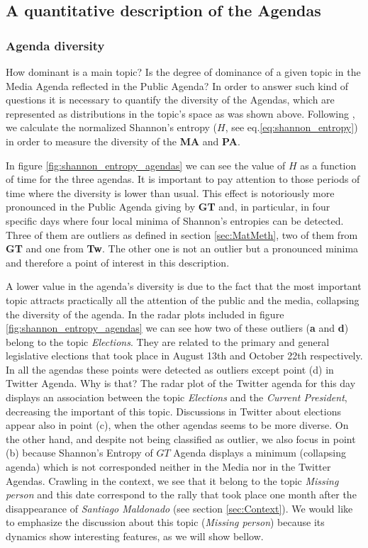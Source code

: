 \documentclass{bmcart}
\begin{document}
\subsection*{A quantitative description of the Agendas}

\subsubsection*{Agenda diversity}

\par How dominant is a main topic? Is the degree of dominance of a given topic in the Media Agenda reflected in the Public Agenda? In order to answer such kind of questions it is necessary  to quantify the diversity of the Agendas, which are represented as  distributions in the topic's space as was shown above.
Following \cite{boydstun2014importance}, we calculate the normalized Shannon's entropy ($H$, see eq.\ref{eq:shannon_entropy}) in order to measure the diversity of the \textbf{MA} and \textbf{PA}.
\par In figure \ref{fig:shannon_entropy_agendas} we can see the value of $H$ as a function of time for the three agendas. It is important to pay attention to those periods of time where the diversity is lower than usual. This effect is notoriously more pronounced in the Public Agenda giving by \textbf{GT} and, in particular, in four specific days  where  four local minima of Shannon's entropies can be detected. Three of them are outliers as defined in section \ref{sec:MatMeth}, two of them from \textbf{GT} and one from \textbf{Tw}. The other one is not an outlier but a pronounced minima and therefore a point of interest in this description. 
 
\par A lower value in the agenda's diversity is due to the fact that the most important topic attracts practically all the attention of the public and the media, collapsing the diversity of the agenda.
In the radar plots included in figure \ref{fig:shannon_entropy_agendas} we can see how two of these outliers (\textbf{a} and \textbf{d}) belong to the topic \emph{Elections}. They are related to the primary and general legislative elections that took place in August 13th and October 22th respectively.
In all the agendas these points were detected as outliers except point (d) in Twitter Agenda. Why is that? The radar plot of the Twitter agenda for this day displays an association between the topic \emph{Elections} and the \emph{Current President}, decreasing the important of this topic.
Discussions in Twitter about elections appear also in point (c), when the other agendas seems to be more diverse. 
On the other hand, and despite not being classified as outlier, we also focus in point (b) because Shannon's Entropy of $GT$ Agenda displays a minimum (collapsing agenda) which is not corresponded neither in the Media nor in the Twitter Agendas. Crawling in the context, we see that it belong to the topic \emph{Missing person} and this date correspond to the rally that took place one month after the disappearance of \emph{Santiago Maldonado} (see section \ref{sec:Context}). 
We  would like to emphasize the discussion about this topic (\emph{Missing person}) because its dynamics show interesting features, as we will show bellow.
\end{document}
